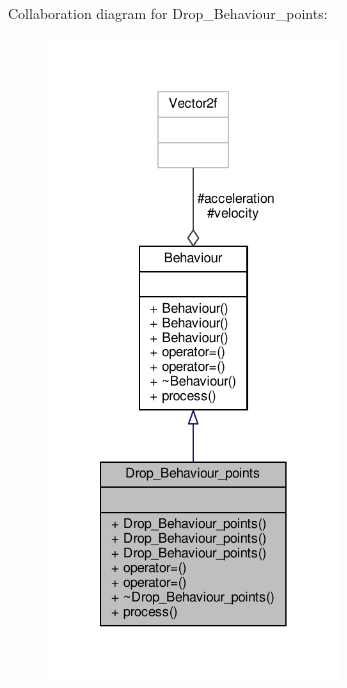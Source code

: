 Collaboration diagram for Drop\+\_\+\+Behaviour\+\_\+points\+:\nopagebreak
\begin{figure}[H]
\begin{center}
\leavevmode
\includegraphics[width=218pt]{classDrop__Behaviour__points__coll__graph}
\end{center}
\end{figure}
